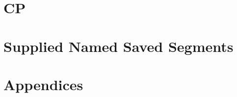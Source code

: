 \documentclass[12pt]{book}
\begin{document}





\part{CP}
\label{part:cp}


\part{Supplied Named Saved Segments}
\label{part:supplied-nss}


\appendix
\part{Appendices}
\label{part:appendices}

\end{document}
